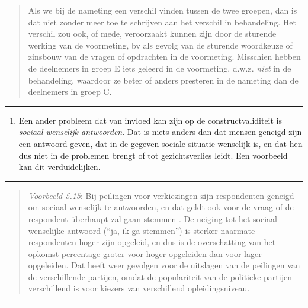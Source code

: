 \documentclass[
]{book}
\providecommand{\tightlist}{%
  \setlength{\itemsep}{0pt}\setlength{\parskip}{0pt}}
\begin{document}
\begin{quote}
Als we bij de nameting een verschil vinden tussen de twee groepen, dan
is dat niet zonder meer toe te schrijven aan het verschil in
behandeling. Het verschil zou ook, of mede, veroorzaakt kunnen zijn door
de sturende werking van de voormeting, bv als gevolg van de sturende
woordkeuze of zinsbouw van de vragen of opdrachten in de voormeting.
Misschien hebben de deelnemers in groep E iets geleerd in de voormeting,
d.w.z. \emph{niet} in de behandeling, waardoor ze beter of anders presteren
in de nameting dan de deelnemers in groep C.
\end{quote}

\begin{center}\rule{0.5\linewidth}{0.5pt}\end{center}

\begin{enumerate}
\def\labelenumi{\arabic{enumi}.}
\setcounter{enumi}{5}
\tightlist
\item
  Een ander probleem dat van invloed kan zijn op de
  constructvaliditeit is \emph{sociaal wenselijk
  antwoorden}. Dat is niets anders dan dat mensen
  geneigd zijn een antwoord geven, dat in de gegeven sociale situatie
  wenselijk is, en dat hen dus niet in de problemen brengt of tot
  gezichtsverlies leidt. Een voorbeeld kan dit verduidelijken.
\end{enumerate}

\begin{center}\rule{0.5\linewidth}{0.5pt}\end{center}

\begin{quote}
\emph{Voorbeeld 5.15}: Bij peilingen voor verkiezingen zijn respondenten geneigd om sociaal wenselijk te antwoorden, en dat geldt ook voor de vraag of de respondent überhaupt zal gaan stemmen \citep{Karp05}. De neiging tot het sociaal wenselijke antwoord (``ja, ik ga stemmen'') is sterker naarmate respondenten hoger zijn opgeleid, en dus is de overschatting van het opkomst-percentage groter voor hoger-opgeleiden dan voor lager-opgeleiden. Dat heeft weer gevolgen voor de uitslagen van de peilingen van de verschillende partijen, omdat de populariteit van de politieke partijen verschillend is voor kiezers van verschillend opleidingsniveau.
\end{quote}

\begin{center}\rule{0.5\linewidth}{0.5pt}\end{center}
\end{document}
